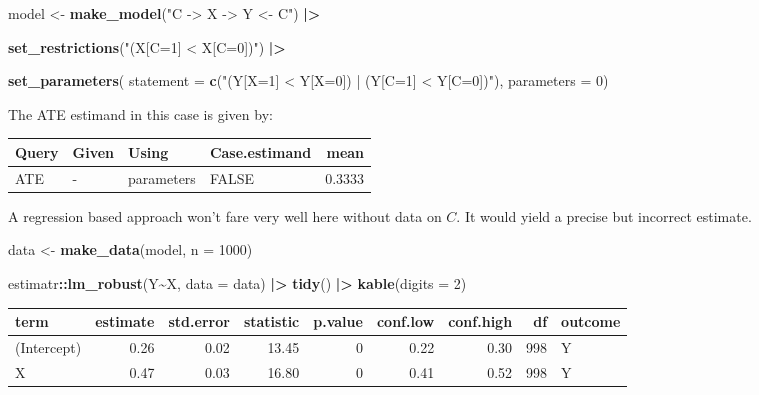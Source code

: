 \documentclass[
  12pt,
]{book}
\newenvironment{Shaded}{\begin{snugshade}}{\end{snugshade}}
\newcommand{\AttributeTok}[1]{\textcolor[rgb]{0.13,0.29,0.53}{#1}}
\newcommand{\DecValTok}[1]{\textcolor[rgb]{0.00,0.00,0.81}{#1}}
\newcommand{\FunctionTok}[1]{\textcolor[rgb]{0.13,0.29,0.53}{\textbf{#1}}}
\newcommand{\NormalTok}[1]{#1}
\newcommand{\OtherTok}[1]{\textcolor[rgb]{0.56,0.35,0.01}{#1}}
\newcommand{\SpecialCharTok}[1]{\textcolor[rgb]{0.81,0.36,0.00}{\textbf{#1}}}
\newcommand{\StringTok}[1]{\textcolor[rgb]{0.31,0.60,0.02}{#1}}
\begin{document}
\begin{Shaded}
\begin{Highlighting}[]
\NormalTok{model }\OtherTok{\textless{}{-}} \FunctionTok{make\_model}\NormalTok{(}\StringTok{"C {-}\textgreater{} X {-}\textgreater{} Y \textless{}{-} C"}\NormalTok{) }\SpecialCharTok{|\textgreater{}}
  
  \FunctionTok{set\_restrictions}\NormalTok{(}\StringTok{"(X[C=1] \textless{} X[C=0])"}\NormalTok{) }\SpecialCharTok{|\textgreater{}}

  \FunctionTok{set\_parameters}\NormalTok{(}
           \AttributeTok{statement =} \FunctionTok{c}\NormalTok{(}\StringTok{"(Y[X=1] \textless{} Y[X=0]) | (Y[C=1] \textless{} Y[C=0])"}\NormalTok{), }
           \AttributeTok{parameters =} \DecValTok{0}\NormalTok{)}
\end{Highlighting}
\end{Shaded}

The ATE estimand in this case is given by:

\begin{tabular}{l|l|l|l|r}
\hline
Query & Given & Using & Case.estimand & mean\\
\hline
ATE & - & parameters & FALSE & 0.3333\\
\hline
\end{tabular}

A regression based approach won't fare very well here without data on \(C\). It would yield a precise but incorrect estimate.

\begin{Shaded}
\begin{Highlighting}[]
\NormalTok{data }\OtherTok{\textless{}{-}} \FunctionTok{make\_data}\NormalTok{(model, }\AttributeTok{n =} \DecValTok{1000}\NormalTok{)}

\NormalTok{estimatr}\SpecialCharTok{::}\FunctionTok{lm\_robust}\NormalTok{(Y}\SpecialCharTok{\textasciitilde{}}\NormalTok{X, }\AttributeTok{data =}\NormalTok{ data) }\SpecialCharTok{|\textgreater{}}
  \FunctionTok{tidy}\NormalTok{() }\SpecialCharTok{|\textgreater{}} 
  \FunctionTok{kable}\NormalTok{(}\AttributeTok{digits =} \DecValTok{2}\NormalTok{)}
\end{Highlighting}
\end{Shaded}

\begin{tabular}{l|r|r|r|r|r|r|r|l}
\hline
term & estimate & std.error & statistic & p.value & conf.low & conf.high & df & outcome\\
\hline
(Intercept) & 0.26 & 0.02 & 13.45 & 0 & 0.22 & 0.30 & 998 & Y\\
\hline
X & 0.47 & 0.03 & 16.80 & 0 & 0.41 & 0.52 & 998 & Y\\
\hline
\end{tabular}
\end{document}
